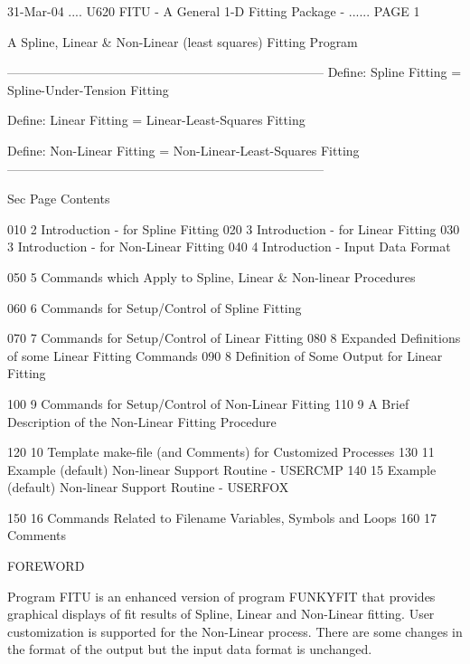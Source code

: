    31-Mar-04 .... U620  FITU - A General 1-D Fitting Package - ...... PAGE   1
 
 
 
          A Spline, Linear & Non-Linear (least squares) Fitting Program
 
   ---------------------------------------------------------------------------
   Define:     Spline Fitting  =      Spline-Under-Tension Fitting
 
   Define:     Linear Fitting  =      Linear-Least-Squares Fitting
 
   Define: Non-Linear Fitting  =  Non-Linear-Least-Squares Fitting
   ---------------------------------------------------------------------------
 
 
   Sec Page Contents
 
   010   2  Introduction - for     Spline Fitting
   020   3  Introduction - for     Linear Fitting
   030   3  Introduction - for Non-Linear Fitting
   040   4  Introduction - Input Data Format
 
   050   5  Commands which Apply to Spline,  Linear & Non-linear Procedures
 
   060   6  Commands for Setup/Control of Spline Fitting
 
   070   7  Commands for Setup/Control of Linear Fitting
   080   8  Expanded Definitions of some  Linear Fitting Commands
   090   8  Definition of Some Output for Linear Fitting
 
   100   9  Commands for Setup/Control of Non-Linear Fitting
   110   9  A Brief Description of the    Non-Linear Fitting Procedure
 
   120  10  Template make-file (and Comments) for Customized Processes
   130  11  Example (default) Non-linear Support Routine - USERCMP
   140  15  Example (default) Non-linear Support Routine - USERFOX
 
   150  16  Commands Related to Filename Variables, Symbols and Loops
   160  17  Comments
 
 
 
                                    FOREWORD
 
   Program  FITU  is  an  enhanced  version  of program FUNKYFIT that provides
   graphical  displays  of  fit  results  of  Spline,  Linear  and  Non-Linear
   fitting.  User customization is supported for the Non-Linear process. There
   are some changes in the format of the output but the input data  format  is
   unchanged.
 
 
 
